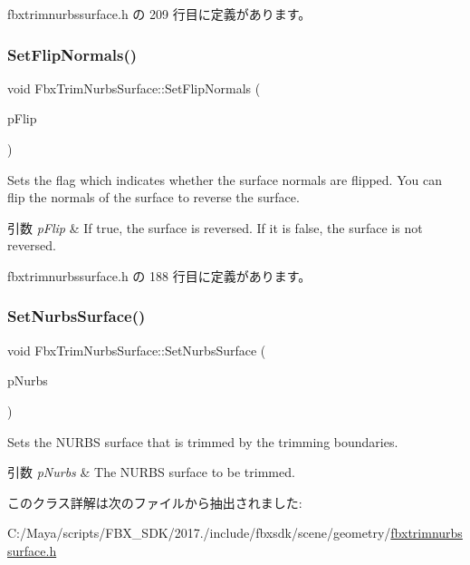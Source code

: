  fbxtrimnurbssurface.\+h の 209 行目に定義があります。

\mbox{\label{class_fbx_trim_nurbs_surface_a5f73a1d5abe4f71741ddc82fb7d003c8}} 
\subsubsection{\texorpdfstring{Set\+Flip\+Normals()}{SetFlipNormals()}}
{\footnotesize\ttfamily void Fbx\+Trim\+Nurbs\+Surface\+::\+Set\+Flip\+Normals (\begin{DoxyParamCaption}\item[{bool}]{p\+Flip }\end{DoxyParamCaption})\hspace{0.3cm}{\ttfamily [inline]}}

Sets the flag which indicates whether the surface normals are flipped. You can flip the normals of the surface to reverse the surface. 
\begin{DoxyParams}{引数}
{\em p\+Flip} & If {\ttfamily true}, the surface is reversed. If it is false, the surface is not reversed. \\
\hline
\end{DoxyParams}


 fbxtrimnurbssurface.\+h の 188 行目に定義があります。

\mbox{\label{class_fbx_trim_nurbs_surface_ab255a3f5402aa8adb8d834af524ac291}} 
\subsubsection{\texorpdfstring{Set\+Nurbs\+Surface()}{SetNurbsSurface()}}
{\footnotesize\ttfamily void Fbx\+Trim\+Nurbs\+Surface\+::\+Set\+Nurbs\+Surface (\begin{DoxyParamCaption}\item[{const \hyperlink{class_fbx_nurbs_surface}{Fbx\+Nurbs\+Surface} $\ast$}]{p\+Nurbs }\end{DoxyParamCaption})}

Sets the N\+U\+R\+BS surface that is trimmed by the trimming boundaries. 
\begin{DoxyParams}{引数}
{\em p\+Nurbs} & The N\+U\+R\+BS surface to be trimmed. \\
\hline
\end{DoxyParams}


このクラス詳解は次のファイルから抽出されました\+:\begin{DoxyCompactItemize}
\item 
C\+:/\+Maya/scripts/\+F\+B\+X\+\_\+\+S\+D\+K/2017./include/fbxsdk/scene/geometry/\hyperlink{fbxtrimnurbssurface_8h}{fbxtrimnurbssurface.\+h}\end{DoxyCompactItemize}
